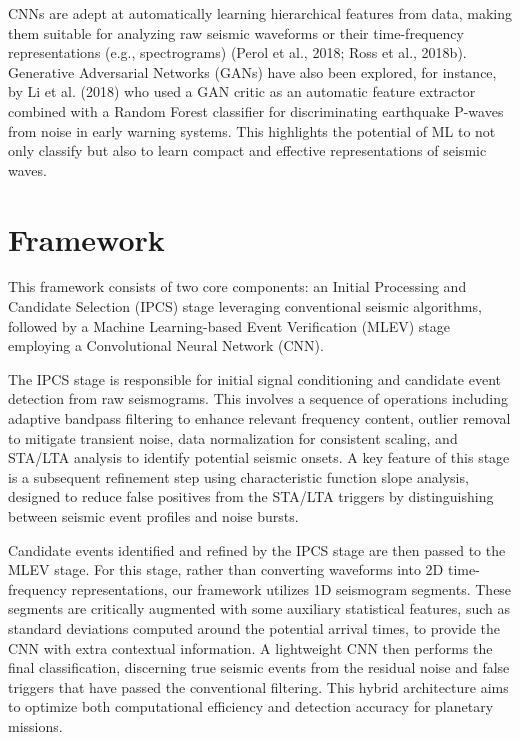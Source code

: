 \documentclass[conference]{IEEEtran}
\begin{document}
        CNNs are adept at automatically learning hierarchical features from data, making them suitable for analyzing raw
        seismic waveforms or their time-frequency representations (e.g., spectrograms) (Perol et al., 2018; Ross et al.,
        2018b). Generative Adversarial Networks (GANs) have also been explored, for instance, by Li et al. (2018) who
        used a GAN critic as an automatic feature extractor combined with a Random Forest classifier for discriminating
        earthquake P-waves from noise in early warning systems. This highlights the potential of ML to not only classify
        but also to learn compact and effective representations of seismic waves.


\section{Framework}
This framework consists of two core components: an Initial Processing and Candidate
Selection (IPCS) stage leveraging conventional seismic algorithms, followed by a Machine Learning-based Event
Verification (MLEV) stage employing a Convolutional Neural Network (CNN).

The IPCS stage is responsible for initial signal conditioning and candidate event detection from raw seismograms. This
involves a sequence of operations including adaptive bandpass filtering to enhance relevant frequency content, outlier
removal to mitigate transient noise, data normalization for consistent scaling, and STA/LTA analysis to identify
potential seismic onsets. A key feature of this stage is a subsequent refinement step using characteristic function
slope analysis, designed to reduce false positives from the STA/LTA triggers by distinguishing between seismic event
profiles and noise bursts.

Candidate events identified and refined by the IPCS stage are then passed to the MLEV stage. For this stage, rather than
converting waveforms into 2D time-frequency representations, our framework utilizes 1D seismogram segments. These
segments are critically augmented with some auxiliary statistical features, such as standard deviations computed around
the potential arrival times, to provide the CNN with extra contextual information. A lightweight CNN then performs the
final classification, discerning true seismic events from the residual noise and false triggers that have passed the
conventional filtering. This hybrid architecture aims to optimize both computational efficiency and detection accuracy
for planetary missions.
    
\end{document}
